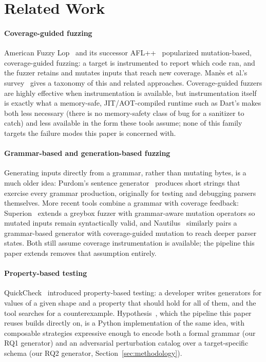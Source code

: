 \section{Related Work}
\label{sec:related-work}

\paragraph{Coverage-guided fuzzing}
American Fuzzy Lop~\cite{zalewski2014afl} and its successor AFL++~\cite{fioraldi2020aflplusplus}
popularized mutation-based, coverage-guided fuzzing: a target is
instrumented to report which code ran, and the fuzzer retains and mutates
inputs that reach new coverage. Man\`es et al.'s survey~\cite{manes2021fuzzing}
gives a taxonomy of this and related approaches. Coverage-guided fuzzers are
highly effective when instrumentation is available, but instrumentation
itself is exactly what a memory-safe, JIT/AOT-compiled runtime such as
Dart's makes both less necessary (there is no memory-safety class of bug for
a sanitizer to catch) and less available in the form these tools assume;
none of this family targets the failure modes this paper is concerned with.

\paragraph{Grammar-based and generation-based fuzzing}
Generating inputs directly from a grammar, rather than mutating bytes, is a
much older idea: Purdom's sentence generator~\cite{purdom1972sentence}
produces short strings that exercise every grammar production, originally
for testing and debugging parsers themselves. More recent tools combine a
grammar with coverage feedback: Superion~\cite{wang2019superion} extends a
greybox fuzzer with grammar-aware mutation operators so mutated inputs
remain syntactically valid, and Nautilus~\cite{aschermann2019nautilus}
similarly pairs a grammar-based generator with coverage-guided mutation to
reach deeper parser states. Both still assume coverage instrumentation is
available; the pipeline this paper extends removes that assumption
entirely.

\paragraph{Property-based testing}
QuickCheck~\cite{claessen2000quickcheck} introduced property-based testing:
a developer writes generators for values of a given shape and a property
that should hold for all of them, and the tool searches for a
counterexample. Hypothesis~\cite{maciver2019hypothesis}, which the pipeline
this paper reuses builds directly on, is a Python implementation of the
same idea, with composable strategies expressive enough to encode both a
formal grammar (our RQ1 generator) and an adversarial perturbation catalog
over a target-specific schema (our RQ2 generator, Section~\ref{sec:methodology}).


